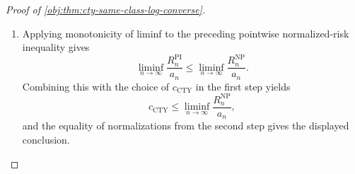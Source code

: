 \begin{proof}[Proof of \cref{obj:thm:cty-same-class-log-converse}]
\begin{enumerate}
Second, for a common-map rule the two expectation conventions coincide term by term.  Fix \(P\in\mathcal P_{\mathrm{NP}}(L,q)\) and a common map \(T_n\), and write the boundary loss at the sample point \(w\) as
\[
\Lambda_P(w)=\sup_{x\in\operatorname{bd}(\mathcal X_P)}
\bigl|T_n\bigl(V_{n,P}(x)\big|_{w}\bigr)-\mu_P(x)\bigr| .
\]
The map
\[
(x,w)\longmapsto
\bigl|T_n\bigl(V_{n,P}(x)\big|_{w}\bigr)-\mu_P(x)\bigr|,
\qquad
(x,w)\in\operatorname{bd}(\mathcal X_P)\times(\mathbb R\times\mathbb R^2)^n,
\]
is jointly Borel: \(T_n\) is measurable, \((x,w)\mapsto V_{n,P}(x)|_{w}\) is continuous in \(x\) and Borel in \(w\), and \(\mu_P\) is continuous on the compact set \(\mathcal X_P\supseteq\operatorname{bd}(\mathcal X_P)\) because it lies in the Hölder ball of \cref{obj:synth_36}.
Consequently, for every level \(a\),
\[
\{w:\Lambda_P(w)>a\}
=
\Bigl\{w:\exists\,x\in\operatorname{bd}(\mathcal X_P),\ \bigl|T_n\bigl(V_{n,P}(x)\big|_{w}\bigr)-\mu_P(x)\bigr|>a\Bigr\}
\]
is the projection onto the sample coordinate of a Borel subset of the product of the Polish space \(\operatorname{bd}(\mathcal X_P)\) with the sample space, hence an analytic set.
Analytic sets are universally measurable, so every superlevel set of \(\Lambda_P\) is measurable for the completion of the product law generated by \(P\); therefore \(\Lambda_P\) is measurable on that completed space and its completed integral coincides with its outer expectation,
\[
\int \Lambda_P\,d\overline{P^{\,n}}
=
\mathbb E_P^*\left[\sup_{x\in\operatorname{bd}(\mathcal X_P)}\bigl|\widehat\mu_n(x)-\mu_P(x)\bigr|\right].
\]

Taking the supremum over \(P\in\mathcal P_{\mathrm{NP}}(L,q)\) in the last display and then the infimum over the larger point-indexed class in \cref{obj:def:point-indexed-distance-risk} bounds \(R_n^{\mathrm{PI}}\) above by the common-map risk in \cref{obj:def:cty-distance-risk}, which is the displayed inequality.  Dividing by the same nonnegative normalizing factor preserves this order:
\[
\frac{R_n^{\mathrm{PI}}}{a_n}
\leq
\frac{R_n^{\mathrm{NP}}}{a_n}.
\]

\item Applying monotonicity of liminf to the preceding pointwise normalized-risk inequality gives
\[
\liminf_{n\to\infty}\frac{R_n^{\mathrm{PI}}}{a_n}
\leq
\liminf_{n\to\infty}\frac{R_n^{\mathrm{NP}}}{a_n}.
\]
Combining this with the choice of \(c_{\mathrm{CTY}}\) in the first step yields
\[
c_{\mathrm{CTY}}
\leq
\liminf_{n\to\infty}\frac{R_n^{\mathrm{NP}}}{a_n},
\]
and the equality of normalizations from the second step gives the displayed conclusion.
\end{enumerate}
\end{proof}

